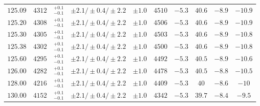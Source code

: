 \begin{table}[ht]
\begin{center}
\begin{small}
\begin{tabular}{cccccccc|cc}
$125.09$ & $4312$ & $^{+0.1}_{-0.1}$ & $\pm 2.1/\pm 0.4/\pm 2.2$ & $\pm 1.0$ & $4510$ & $-5.3$ & $40.6$ & $-8.9$ & $-10.9$ \\
$125.20$ & $4308$ & $^{+0.1}_{-0.1}$ & $\pm 2.1/\pm 0.4/\pm 2.2$ & $\pm 1.0$ & $4506$ & $-5.3$ & $40.6$ & $-8.9$ & $-10.9$ \\
$125.30$ & $4305$ & $^{+0.1}_{-0.1}$ & $\pm 2.1/\pm 0.4/\pm 2.2$ & $\pm 1.0$ & $4503$ & $-5.3$ & $40.6$ & $-8.9$ & $-10.8$ \\
$125.38$ & $4302$ & $^{+0.1}_{-0.1}$ & $\pm 2.1/\pm 0.4/\pm 2.2$ & $\pm 1.0$ & $4500$ & $-5.3$ & $40.6$ & $-8.9$ & $-10.8$ \\
$125.60$ & $4295$ & $^{+0.1}_{-0.1}$ & $\pm 2.1/\pm 0.4/\pm 2.2$ & $\pm 1.0$ & $4492$ & $-5.3$ & $40.5$ & $-8.9$ & $-10.6$ \\
$126.00$ & $4282$ & $^{+0.1}_{-0.1}$ & $\pm 2.1/\pm 0.4/\pm 2.2$ & $\pm 1.0$ & $4478$ & $-5.3$ & $40.5$ & $-8.8$ & $-10.5$ \\
$128.00$ & $4216$ & $^{+0.1}_{-0.1}$ & $\pm 2.1/\pm 0.4/\pm 2.2$ & $\pm 1.0$ & $4409$ & $-5.3$ & $40  $ & $-8.6$ & $-10  $ \\
$130.00$ & $4152$ & $^{+0.1}_{-0.1}$ & $\pm 2.1/\pm 0.4/\pm 2.2$ & $\pm 1.0$ & $4342$ & $-5.3$ & $39.7$ & $-8.4$ & $-9.5 $ \\
\bottomrule
\end{tabular}%
\end{small}%
\end{center}%
\end{table}












































